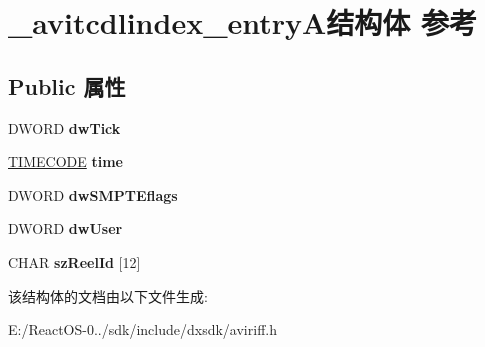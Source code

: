 \hypertarget{struct__avitcdlindex__entry_a}{}\section{\+\_\+avitcdlindex\+\_\+entry\+A结构体 参考}
\label{struct__avitcdlindex__entry_a}
\subsection*{Public 属性}
\begin{DoxyCompactItemize}
\item 
\mbox{\label{struct__avitcdlindex__entry_a_aeaa164edb0afcbd1587c0f462d2e9da6}} 
D\+W\+O\+RD {\bfseries dw\+Tick}
\item 
\mbox{\label{struct__avitcdlindex__entry_a_af527e8bd45e011f4de64dffad0cd0ebd}} 
\hyperlink{union__timecode}{T\+I\+M\+E\+C\+O\+DE} {\bfseries time}
\item 
\mbox{\label{struct__avitcdlindex__entry_a_a0cb3457868cf786cf8ee492d8bcbbf38}} 
D\+W\+O\+RD {\bfseries dw\+S\+M\+P\+T\+Eflags}
\item 
\mbox{\label{struct__avitcdlindex__entry_a_aa82b3bbd3cb8c3fd2b222c4a47a9f5fd}} 
D\+W\+O\+RD {\bfseries dw\+User}
\item 
\mbox{\label{struct__avitcdlindex__entry_a_a7c577b6b581dc1314f2377d2d73ca371}} 
C\+H\+AR {\bfseries sz\+Reel\+Id} \mbox{[}12\mbox{]}
\end{DoxyCompactItemize}


该结构体的文档由以下文件生成\+:\begin{DoxyCompactItemize}
\item 
E\+:/\+React\+O\+S-\/0../sdk/include/dxsdk/aviriff.\+h\end{DoxyCompactItemize}
